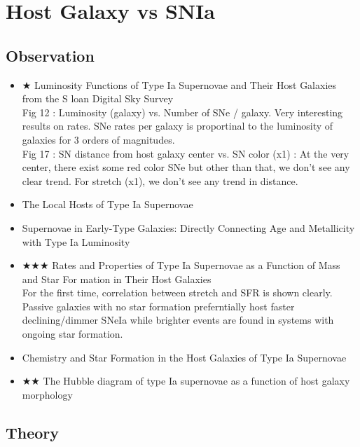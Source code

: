 \section{Host Galaxy vs SNIa}
\subsection{Observation}
\begin{itemize}
\item $\bigstar$ Luminosity Functions of Type Ia Supernovae and Their Host Galaxies from the S
loan Digital Sky Survey \citep{yasuda10a} \\
Fig 12 : Luminosity (galaxy) vs. Number of SNe / galaxy.  Very interesting results on rates.  
SNe rates per galaxy is proportinal to the luminosity of galaxies for 3 orders of magnitudes.\\
Fig 17 : SN distance from host galaxy center vs. SN color (x1) : At the very center, there exist
some red color SNe but other than that, we don't see any clear trend.  For stretch (x1), we
don't see any trend in distance.

\item The Local Hosts of Type Ia Supernovae \citep{neill09a} \\

\item Supernovae in Early-Type Galaxies: Directly Connecting Age and Metallicity with Type Ia 
Luminosity
\citep[][\#32:4/30/10, gallagher08a]{gallagher08a} \\

\item $\bigstar\bigstar\bigstar$ Rates and Properties of Type Ia Supernovae as a Function 
of Mass and Star For mation in Their Host Galaxies 
\citep[][\#147:4/30/10,sullivan06a]{sullivan06a}\\
For the first time, correlation between stretch and SFR is shown clearly.
Passive galaxies with no star formation preferntially host faster declining/dimmer
SNeIa while brighter events are found in systems with ongoing star formation.

\item Chemistry and Star Formation in the Host Galaxies of Type Ia Supernovae
\citep[][\#67:4/30/10, gallagher05a]{gallagher05a} \\

\item $\bigstar\bigstar$ The Hubble diagram of type Ia supernovae as a function of host galaxy morphology \citep[][\#76, 4/30/10, sullivan03a]{sullivan03a} \\
\end{itemize}

\subsection{Theory}
